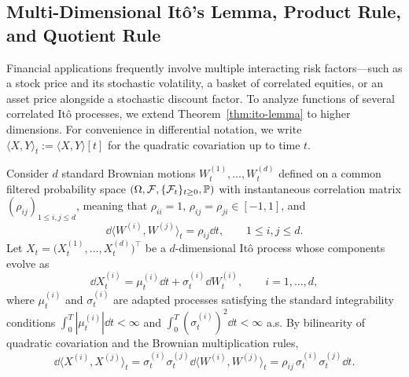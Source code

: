 \subsection{Multi-Dimensional It\^o's Lemma, Product Rule, and Quotient Rule}
\label{subsec:multidim-ito}

Financial applications frequently involve multiple interacting risk factors---such as a stock price and its stochastic volatility, a basket of correlated equities, or an asset price alongside a stochastic discount factor. To analyze functions of several correlated It\^o processes, we extend Theorem~\ref{thm:ito-lemma} to higher dimensions. For convenience in differential notation, we write $\langle X, Y \rangle_t := \langle X, Y \rangle[t]$ for the quadratic covariation up to time $t$.

Consider $d$ standard Brownian motions $W_t^{(1)}, \dots, W_t^{(d)}$ defined on a common filtered probability space $(\Omega, \mathcal{F}, \{\mathcal{F}_t\}_{t \ge 0}, \mathbb{P})$ with instantaneous correlation matrix $(\rho_{ij})_{1 \le i, j \le d}$, meaning that $\rho_{ii} = 1$, $\rho_{ij} = \rho_{ji} \in [-1, 1]$, and
\[
\dd\langle W^{(i)}, W^{(j)} \rangle_t = \rho_{ij}\dd t, \qquad 1 \le i, j \le d.
\]
Let $X_t = \big(X_t^{(1)}, \dots, X_t^{(d)}\big)^\top$ be a $d$-dimensional It\^o process whose components evolve as
\[
\dd X_t^{(i)} = \mu_t^{(i)}\dd t + \sigma_t^{(i)}\dd W_t^{(i)}, \qquad i = 1, \dots, d,
\]
where $\mu_t^{(i)}$ and $\sigma_t^{(i)}$ are adapted processes satisfying the standard integrability conditions $\int_0^T |\mu_t^{(i)}|\dd t < \infty$ and $\int_0^T (\sigma_t^{(i)})^2 \dd t < \infty$ a.s. By bilinearity of quadratic covariation and the Brownian multiplication rules,
\[
\dd\langle X^{(i)}, X^{(j)} \rangle_t = \sigma_t^{(i)} \sigma_t^{(j)} \dd\langle W^{(i)}, W^{(j)} \rangle_t = \rho_{ij}\,\sigma_t^{(i)}\sigma_t^{(j)}\dd t.
\]

